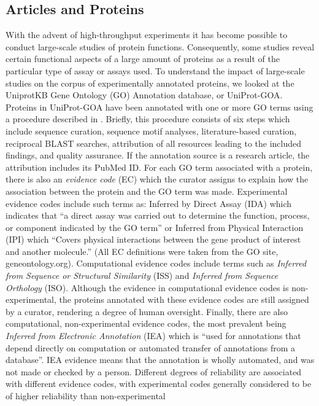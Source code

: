 \documentclass[12pt]{article}
\begin{document}
\subsection*{Articles and Proteins} With the advent of high-throughput experiments it has
become possible to conduct large-scale studies of protein functions.  Consequently, some
studies reveal certain functional aspects of a large amount of proteins as a result of
the particular type of assay or assays used. To understand the impact of large-scale studies
on the corpus of experimentally annotated proteins, we looked at the UniprotKB Gene Ontology
(GO) Annotation database, or UniProt-GOA. Proteins in UniProt-GOA have been
annotated with 
one or more GO terms using a procedure described in \cite{Dimmer2012UniProtGO}. Briefly,
this procedure consists of six steps which include sequence curation, sequence motif
analyses, literature-based curation, reciprocal BLAST\cite{Altschul1997Gapped} searches,
attribution of all resources leading to the included findings, and quality assurance. If the
annotation source is a research article, the attribution includes its PubMed ID. For each GO
term associated with a protein, there is also an \textit{evidence code} (EC) which the
curator assigns to explain how the association between the protein and the GO term was made.
Experimental evidence codes include such terms as: Inferred by Direct Assay (IDA) which
indicates that ``a direct assay was carried out to determine the function, process, or
component indicated by the GO term'' or Inferred from Physical Interaction (IPI) which
``Covers physical interactions between the gene product of interest and another molecule.''
(All EC definitions were taken from the GO site, geneontology.org).  Computational evidence
codes include terms such as \textit{Inferred from Sequence or Structural Similarity} (ISS)
and \textit{Inferred from Sequence Orthology} (ISO).  Although the evidence in computational
evidence codes is non-experimental, the proteins annotated with these evidence codes are
still assigned by a curator, rendering a degree of human oversight. Finally, there are also
computational, non-experimental evidence codes, the most prevalent being
\textit{Inferred from Electronic Annotation} (IEA) which is ``used for annotations that
depend directly on computation or automated transfer of annotations from a database''. IEA
evidence means that the annotation is wholly automated, and was not made or checked by a
person.  Different degrees of reliability are associated with different evidence codes, with
experimental codes generally considered to be of higher reliability than non-experimental
\end{document}
